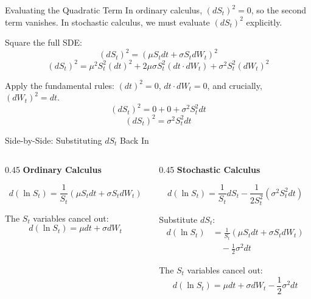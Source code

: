 \documentclass{beamer}
\begin{document}
\begin{frame}{Evaluating the Quadratic Term}
In ordinary calculus, $(dS_t)^2 = 0$, so the second term vanishes. In stochastic calculus, we must evaluate $(dS_t)^2$ explicitly.

\vspace{0.3cm}
Square the full SDE:
\[ (dS_t)^2 = (\mu S_t dt + \sigma S_t dW_t)^2 \]
\[ (dS_t)^2 = \mu^2 S_t^2 (dt)^2 + 2\mu\sigma S_t^2 (dt \cdot dW_t) + \sigma^2 S_t^2 (dW_t)^2 \]

\vspace{0.3cm}
Apply the fundamental rules: $(dt)^2 = 0$, $dt \cdot dW_t = 0$, and crucially, $(dW_t)^2 = dt$.
\[ (dS_t)^2 = 0 + 0 + \sigma^2 S_t^2 dt \]
\[ (dS_t)^2 = \sigma^2 S_t^2 dt \]
\end{frame}

\begin{frame}{Side-by-Side: Substituting $dS_t$ Back In}
\begin{columns}[T]
\begin{column}{0.45\textwidth}
\textbf{Ordinary Calculus}
\vspace{0.3cm}

\[ d(\ln S_t) = \frac{1}{S_t} (\mu S_t dt + \sigma S_t dW_t) \]

The $S_t$ variables cancel out:
\[ d(\ln S_t) = \mu dt + \sigma dW_t \]
\end{column}
\hfill\vrule\hfill
\begin{column}{0.45\textwidth}
\textbf{Stochastic Calculus}
\vspace{0.3cm}

\[ d(\ln S_t) = \frac{1}{S_t} dS_t - \frac{1}{2S_t^2} (\sigma^2 S_t^2 dt) \]

Substitute $dS_t$:
\begin{align*}
d(\ln S_t) &= \frac{1}{S_t}(\mu S_t dt + \sigma S_t dW_t) \\
&\quad - \frac{1}{2}\sigma^2 dt
\end{align*}

The $S_t$ variables cancel out:
\[ d(\ln S_t) = \mu dt + \sigma dW_t - \frac{1}{2}\sigma^2 dt \]
\end{column}
\end{columns}
\end{frame}
\end{document}
